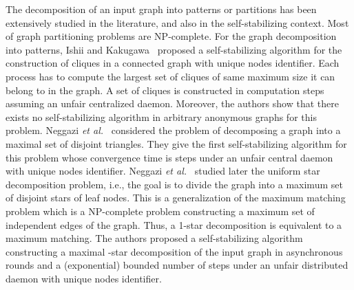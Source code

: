 \documentclass[11pt,letterpaper,onecolumn]{article}
\begin{document}
The decomposition of an input graph into patterns or partitions has been extensively studied in the literature, and also in the self-stabilizing context. Most of graph partitioning problems are NP-complete. For the graph decomposition into patterns, Ishii and Kakugawa~\cite{IshiiK02} proposed a self-stabilizing algorithm for the construction of cliques in a connected graph with unique nodes identifier. Each process has to compute the largest set of cliques of same maximum size it can belong to in the graph. A set of cliques is constructed in  computation steps assuming an unfair centralized daemon. Moreover, the authors show that there exists no self-stabilizing algorithm in arbitrary anonymous graphs for this problem. Neggazi \emph{et al.}~\cite{NeggaziHK12} considered the problem of decomposing a graph into a maximal set of disjoint triangles. They give the first self-stabilizing algorithm for this problem whose convergence time is  steps under an unfair central daemon with unique nodes identifier. Neggazi \emph{et al.}~\cite{NeggaziTHK13} studied later the uniform star decomposition problem, i.e., the goal is to divide the graph into a maximum set of disjoint stars of  leaf nodes. This is a generalization of the maximum matching problem which is a NP-complete problem constructing a maximum set of independent edges of the graph. Thus, a 1-star decomposition is equivalent to a maximum matching. The authors proposed a self-stabilizing algorithm constructing a maximal -star decomposition of the input graph in  asynchronous rounds and a (exponential) bounded number of steps under an unfair distributed daemon with unique nodes identifier.\\
\end{document}
